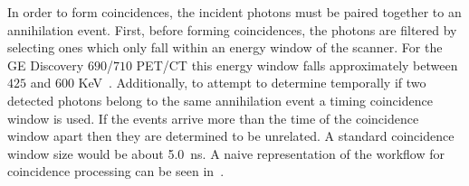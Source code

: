                 In order to form coincidences, the incident photons must be paired together to an annihilation event. First, before forming coincidences, the photons are filtered by selecting ones which only fall within an energy window of the scanner. For the \gls{GE} Discovery $690$/$710$ \gls{PET}/\gls{CT} this energy window falls approximately between $425$ and $600$ \gls{KeV}~\parencite{Bettinardi2011}. Additionally, to attempt to determine temporally if two detected photons belong to the same annihilation event a timing coincidence window is used. If the events arrive more than the time of the coincidence window apart then they are determined to be unrelated. A standard coincidence window size would be about \SI{5.0}{\nano\second}. A naive representation of the workflow for coincidence processing can be seen in~.
            
